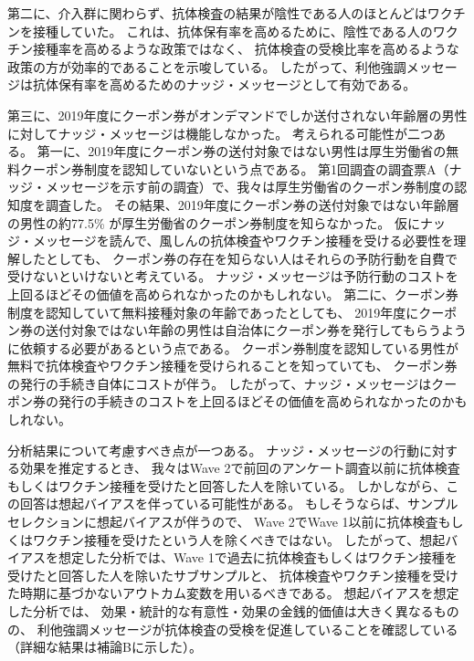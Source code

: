 \documentclass[
  11pt,
  a4paper,
]{article}
\begin{document}
第二に、介入群に関わらず、抗体検査の結果が陰性である人のほとんどはワクチンを接種していた。
これは、抗体保有率を高めるために、陰性である人のワクチン接種率を高めるような政策ではなく、
抗体検査の受検比率を高めるような政策の方が効率的であることを示唆している。
したがって、利他強調メッセージは抗体保有率を高めるためのナッジ・メッセージとして有効である。

第三に、2019年度にクーポン券がオンデマンドでしか送付されない年齢層の男性に対してナッジ・メッセージは機能しなかった。
考えられる可能性が二つある。
第一に、2019年度にクーポン券の送付対象ではない男性は厚生労働省の無料クーポン券制度を認知していないという点である。
第1回調査の調査票A（ナッジ・メッセージを示す前の調査）で、我々は厚生労働省のクーポン券制度の認知度を調査した。
その結果、2019年度にクーポン券の送付対象ではない年齢層の男性の約77.5\%
が厚生労働省のクーポン券制度を知らなかった。
仮にナッジ・メッセージを読んで、風しんの抗体検査やワクチン接種を受ける必要性を理解したとしても、
クーポン券の存在を知らない人はそれらの予防行動を自費で受けないといけないと考えている。
ナッジ・メッセージは予防行動のコストを上回るほどその価値を高められなかったのかもしれない。
第二に、クーポン券制度を認知していて無料接種対象の年齢であったとしても、
2019年度にクーポン券の送付対象ではない年齢の男性は自治体にクーポン券を発行してもらうように依頼する必要があるという点である。
クーポン券制度を認知している男性が無料で抗体検査やワクチン接種を受けられることを知っていても、
クーポン券の発行の手続き自体にコストが伴う。
したがって、ナッジ・メッセージはクーポン券の発行の手続きのコストを上回るほどその価値を高められなかったのかもしれない。

分析結果について考慮すべき点が一つある。
ナッジ・メッセージの行動に対する効果を推定するとき、
我々はWave 2で前回のアンケート調査以前に抗体検査もしくはワクチン接種を受けたと回答した人を除いている。
しかしながら、この回答は想起バイアスを伴っている可能性がある。
もしそうならば、サンプルセレクションに想起バイアスが伴うので、
Wave 2でWave 1以前に抗体検査もしくはワクチン接種を受けたという人を除くべきではない。
したがって、想起バイアスを想定した分析では、Wave 1で過去に抗体検査もしくはワクチン接種を受けたと回答した人を除いたサブサンプルと、
抗体検査やワクチン接種を受けた時期に基づかないアウトカム変数を用いるべきである。
想起バイアスを想定した分析では、
効果・統計的な有意性・効果の金銭的価値は大きく異なるものの、
利他強調メッセージが抗体検査の受検を促進していることを確認している
（詳細な結果は補論Bに示した）。
\end{document}
